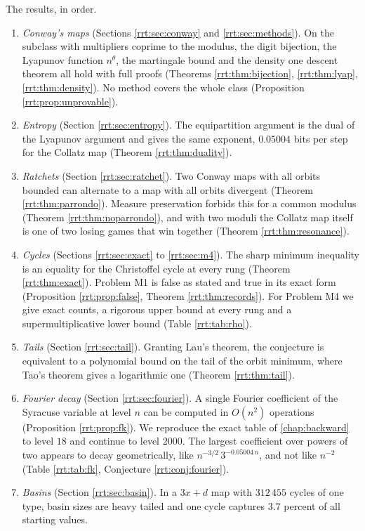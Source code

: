 The results, in order.
\begin{enumerate}
\item \emph{Conway's maps} (Sections \ref{rrt:sec:conway} and \ref{rrt:sec:methods}). On the subclass with multipliers coprime to the modulus, the digit bijection, the Lyapunov function $n^{\theta}$, the martingale bound and the density one descent theorem all hold with full proofs (Theorems \ref{rrt:thm:bijection}, \ref{rrt:thm:lyap}, \ref{rrt:thm:density}). No method covers the whole class (Proposition \ref{rrt:prop:unprovable}).
\item \emph{Entropy} (Section \ref{rrt:sec:entropy}). The equipartition argument is the dual of the Lyapunov argument and gives the same exponent, $0.05004$ bits per step for the Collatz map (Theorem \ref{rrt:thm:duality}).
\item \emph{Ratchets} (Section \ref{rrt:sec:ratchet}). Two Conway maps with all orbits bounded can alternate to a map with all orbits divergent (Theorem \ref{rrt:thm:parrondo}). Measure preservation forbids this for a common modulus (Theorem \ref{rrt:thm:noparrondo}), and with two moduli the Collatz map itself is one of two losing games that win together (Theorem \ref{rrt:thm:resonance}).
\item \emph{Cycles} (Sections \ref{rrt:sec:exact} to \ref{rrt:sec:m4}). The sharp minimum inequality is an equality for the Christoffel cycle at every rung (Theorem \ref{rrt:thm:exact}). Problem M1 is false as stated and true in its exact form (Proposition \ref{rrt:prop:false}, Theorem \ref{rrt:thm:records}). For Problem M4 we give exact counts, a rigorous upper bound at every rung and a supermultiplicative lower bound (Table \ref{rrt:tab:rho}).
\item \emph{Tails} (Section \ref{rrt:sec:tail}). Granting Lau's theorem, the conjecture is equivalent to a polynomial bound on the tail of the orbit minimum, where Tao's theorem gives a logarithmic one (Theorem \ref{rrt:thm:tail}).
\item \emph{Fourier decay} (Section \ref{rrt:sec:fourier}). A single Fourier coefficient of the Syracuse variable at level $n$ can be computed in $O(n^2)$ operations (Proposition \ref{rrt:prop:fk}). We reproduce the exact table of \cref{chap:backward} to level $18$ and continue to level $2000$. The largest coefficient over powers of two appears to decay geometrically, like $n^{-3/2}\,3^{-0.05004\,n}$, and not like $n^{-2}$ (Table \ref{rrt:tab:fk}, Conjecture \ref{rrt:conj:fourier}).
\item \emph{Basins} (Section \ref{rrt:sec:basin}). In a $3x+d$ map with $312\,455$ cycles of one type, basin sizes are heavy tailed and one cycle captures $3.7$ percent of all starting values.
\end{enumerate}

